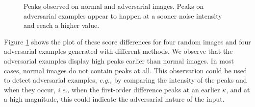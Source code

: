 \begin{figure}[htp]
    \centering


    \caption{Peaks observed on normal and adversarial images. Peaks on
        adversarial examples appear to happen at a sooner noise intensity and
        reach a higher value.}
    \label{fig:peaks}
\end{figure}

Figure \ref{fig:peaks} shows the plot of these score differences for four random
images and four adversarial examples generated with different methods. We
observe that the adversarial examples display high peaks earlier than normal
images. In most cases, normal images do not contain peaks at all. This
observation could be used to detect adversarial examples, \emph{e.g.,} by
comparing the intensity of the peaks and when they occur, \emph{i.e.,} when the
first-order difference peaks at an earlier $\kappa$, and at a high magnitude,
this could indicate the adversarial nature of the input.

